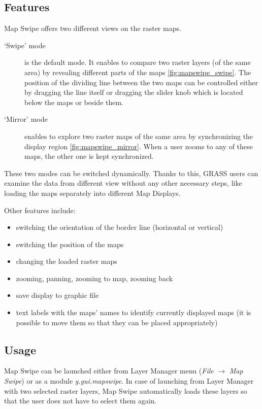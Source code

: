 \documentclass[a4paper,12pt,oneside]{book}
\newcommand{\module}[1]{\textsl{#1}}
\newcommand{\ms}{Map Swipe\xspace}
\begin{document}
\subsection{Features}
Map Swipe offers two different views on the raster maps.
\begin{description}
  \item[`Swipe' mode] is the default mode. It enables to compare two raster layers (of the same area)
  by revealing different parts of the maps \ref{fig:mapswipe_swipe}.
  The position of the dividing line between the two maps
  can be controlled either by dragging the line itself or dragging the slider knob which
  is located below the maps or beside them.

  \item[`Mirror' mode] enables to explore two raster maps of the same area by
  synchronizing the display region \ref{fig:mapswipe_mirror}. When a user zooms
  to any of these maps, the other one is kept synchronized.
\end{description}

These two modes can be switched dynamically. Thanks to this, GRASS users can
examine the data from different view without any other necessary steps, like loading
the maps separately into different Map Displays.

Other features include:
\begin{itemize}
    \item switching the orientation of the border line (horizontal or vertical)
    \item switching the position of the maps
    \item changing the loaded raster maps
    \item zooming, panning, zooming to map, zooming back
    \item save display to graphic file
    \item text labels with the maps' names to identify currently displayed maps
    (it is possible to move them so that they can be placed appropriately)
\end{itemize}

    
\subsection{Usage}
\ms can be launched either from Layer Manager menu (\emph{File} $\rightarrow$ \emph{Map Swipe}) or
as a module \module{g.gui.mapswipe}.
In case of launching from Layer Manager with two selected raster layers,
\ms automatically loads these layers so that the user does not have to select them again.
\end{document}
